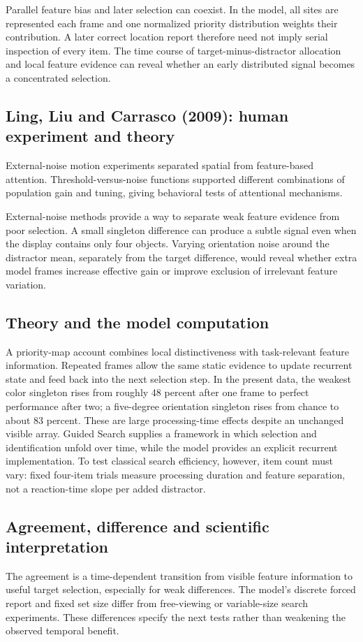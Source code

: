 \documentclass[11pt]{article}
\begin{document}
Parallel feature bias and later selection can coexist. In the model, all sites are represented each frame and one normalized priority distribution weights their contribution. A later correct location report therefore need not imply serial inspection of every item. The time course of target-minus-distractor allocation and local feature evidence can reveal whether an early distributed signal becomes a concentrated selection.

\subsection{Ling, Liu and Carrasco (2009): human experiment and theory}
External-noise motion experiments separated spatial from feature-based attention. Threshold-versus-noise functions supported different combinations of population gain and tuning, giving behavioral tests of attentional mechanisms. \cite{bio_ling}

External-noise methods provide a way to separate weak feature evidence from poor selection. A small singleton difference can produce a subtle signal even when the display contains only four objects. Varying orientation noise around the distractor mean, separately from the target difference, would reveal whether extra model frames increase effective gain or improve exclusion of irrelevant feature variation.

\subsection{Theory and the model computation}
A priority-map account combines local distinctiveness with task-relevant feature information. Repeated frames allow the same static evidence to update recurrent state and feed back into the next selection step. In the present data, the weakest color singleton rises from roughly 48 percent after one frame to perfect performance after two; a five-degree orientation singleton rises from chance to about 83 percent. These are large processing-time effects despite an unchanged visible array. Guided Search supplies a framework in which selection and identification unfold over time, while the model provides an explicit recurrent implementation. To test classical search efficiency, however, item count must vary: fixed four-item trials measure processing duration and feature separation, not a reaction-time slope per added distractor. \cite{bio_wolfe}

\subsection{Agreement, difference and scientific interpretation}
The agreement is a time-dependent transition from visible feature information to useful target selection, especially for weak differences. The model’s discrete forced report and fixed set size differ from free-viewing or variable-size search experiments. These differences specify the next tests rather than weakening the observed temporal benefit.
\end{document}

